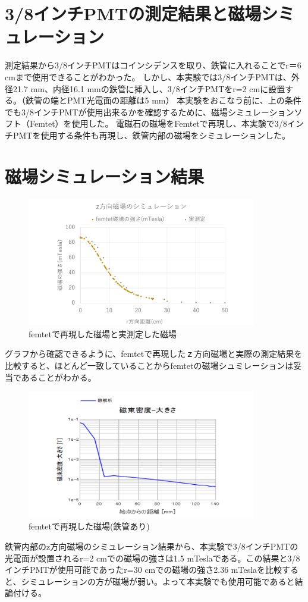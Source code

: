 \section{3/8インチPMTの測定結果と磁場シミュレーション}
測定結果から3/8インチPMTはコインシデンスを取り、鉄管に入れることでr＝6 cmまで使用できることがわかった。
しかし、本実験では3/8インチPMTは、外径21.7 mm、内径16.1 mmの鉄管に挿入し、3/8インチPMTをr=2 cmに設置する。（鉄管の端とPMT光電面の距離は5 mm）
本実験をおこなう前に、上の条件でも3/8インチPMTが使用出来るかを確認するために、磁場シミュレーションソフト（Femtet）を使用した。
電磁石の磁場をFemtetで再現し、本実験で3/8インチPMTを使用する条件も再現し、鉄管内部の磁場をシミュレーションした。

\section{磁場シミュレーション結果}
\begin{figure}[H]
	\centering
		\includegraphics[width=10cm]{fig/iguchi/femtetgraph.pdf}
	\caption{femtetで再現した磁場と実測定した磁場}
	\label{femtegraph}
\end{figure}

グラフから確認できるように、femtetで再現したｚ方向磁場と実際の測定結果を比較すると、ほとんど一致していることからfemtetの磁場シュミレーションは妥当であることがわかる。
\begin{figure}[H]
	\centering
		\includegraphics[width=10cm]{fig/iguchi/maggraphinFe.pdf}
	\caption{femtetで再現した磁場(鉄管あり)}
	\label{maggraphinFe}
\end{figure}
鉄管内部のz方向磁場のシミュレーション結果から、本実験で3/8インチPMTの光電面が設置されるr=2 cmでの磁場の強さは1.5 mTeslaである。この結果と3/8インチPMTが使用可能であったr=30 cmでの磁場の強さ2.36 mTeslaを比較すると、シミュレーションの方が磁場が弱い。よって本実験でも使用可能であると結論付ける。





